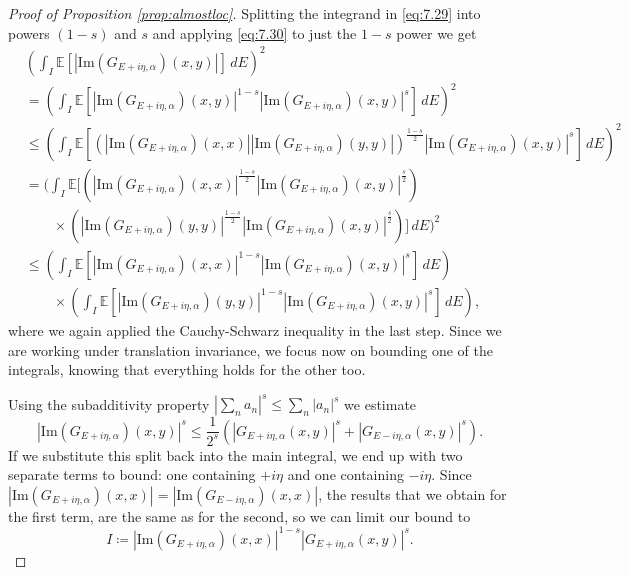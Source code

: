\documentclass[11pt, a4paper, UKenglish, oneside]{book}
\theoremstyle{plain}
\theoremstyle{remark}
\theoremstyle{definition}
\numberwithin{equation}{section}
\numberwithin{theorem}{section}
\begin{document}
\begin{proof}[Proof of Proposition \ref{prop:almostloc}]
    Splitting the integrand in \eqref{eq:7.29} into powers $(1-s)$ and $s$ and applying \eqref{eq:7.30} to just the $1-s$ power we get
    \begin{equation} \label{eq:7.31}
        \begin{split}
        &\left( \int_I \mathbb{E}[|\mathrm{Im}(G_{E + i\eta,\alpha})(x,y)|] \, dE \right)^2 \\
        &= \left( \int_I \mathbb{E}\left[ |\mathrm{Im}(G_{E + i\eta,\alpha})(x,y)|^{1-s} |\mathrm{Im}(G_{E + i\eta,\alpha})(x,y)|^s \right] \, dE \right)^2 \\
        &\le \left( \int_I \mathbb{E}\left[ \left( |\mathrm{Im}(G_{E + i\eta,\alpha})(x,x)| |\mathrm{Im}(G_{E + i\eta,\alpha})(y,y)| \right)^{\frac{1-s}{2}} |\mathrm{Im}(G_{E + i\eta,\alpha})(x,y)|^s \right] \, dE \right)^2 \\
        &= \Biggl( \int_I \mathbb{E}\biggl[ \left( |\mathrm{Im}(G_{E + i\eta,\alpha})(x,x)|^{\frac{1-s}{2}} |\mathrm{Im}(G_{E + i\eta,\alpha})(x,y)|^{\frac{s}{2}} \right)\\
        &\qquad \times \left( |\mathrm{Im}(G_{E + i\eta,\alpha})(y,y)|^{\frac{1-s}{2}} |\mathrm{Im}(G_{E + i\eta,\alpha})(x,y)|^{\frac{s}{2}} \right) \biggr] \, dE \Biggr)^2 \\
        &\le \left( \int_I \mathbb{E}[|\mathrm{Im}(G_{E + i\eta,\alpha})(x,x)|^{1-s} |\mathrm{Im}(G_{E + i\eta,\alpha})(x,y)|^s] \, dE \right) \\
        &\qquad \times \left( \int_I \mathbb{E}[|\mathrm{Im}(G_{E + i\eta,\alpha})(y,y)|^{1-s} |\mathrm{Im}(G_{E + i\eta,\alpha})(x,y)|^s] \, dE \right),
        \end{split}
    \end{equation}
    where we again applied the Cauchy-Schwarz inequality in the last step.
    Since we are working under translation invariance, we focus now on bounding one of the integrals, knowing that everything holds for the other too.

    Using the subadditivity property $\left|\sum_{n} a_{n}\right|^{s} \le \sum_{n} |a_{n}|^{s}$  we estimate
    \begin{equation} \label{eq:7.32}
        |\mathrm{Im}(G_{E + i\eta,\alpha})(x,y)|^s \le \frac{1}{2^s} \left( |G_{E+i\eta,\alpha}(x,y)|^s + |G_{E-i\eta,\alpha}(x,y)|^s \right).
    \end{equation}
    If we substitute this split back into the main integral, we end up with two separate terms to bound: one containing $+i\eta$ and one containing $-i\eta$.
    Since $|\mathrm{Im}(G_{E + i\eta,\alpha})(x,x)|=|\mathrm{Im}(G_{E - i\eta,\alpha})(x,x)|$, the results that we obtain for the first term, are the same as for the second, so we can limit our bound to  
    \begin{equation}
        I \coloneqq|\mathrm{Im}(G_{E + i\eta,\alpha})(x,x)|^{1-s}|G_{E+i\eta,\alpha}(x,y)|^s. \label{eq:3.2.15}
    \end{equation}
    

\end{proof}
\end{document}
